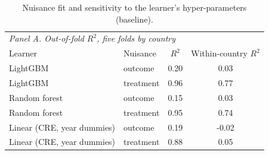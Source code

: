 \documentclass[preprint,12pt,authoryear]{elsarticle}
\begin{document}
\begin{table}[!ht]
\centering
\begin{threeparttable}
\caption{Nuisance fit and sensitivity to the learner's hyper-parameters (baseline).}\label{tab:mldiag}
\scriptsize
\begin{tabular}{llcc}
\toprule
\multicolumn{4}{l}{\textit{Panel A. Out-of-fold $R^2$, five folds by country}}\\
Learner & Nuisance & $R^2$ & Within-country $R^2$\\
\midrule
LightGBM & outcome & 0.20 & 0.03\\
LightGBM & treatment & 0.96 & 0.77\\
Random forest & outcome & 0.15 & 0.03\\
Random forest & treatment & 0.95 & 0.74\\
Linear (CRE, year dummies) & outcome & 0.19 & -0.02\\
Linear (CRE, year dummies) & treatment & 0.88 & 0.05\\
\bottomrule
\end{tabular}


\end{threeparttable}
\end{table}
\end{document}
